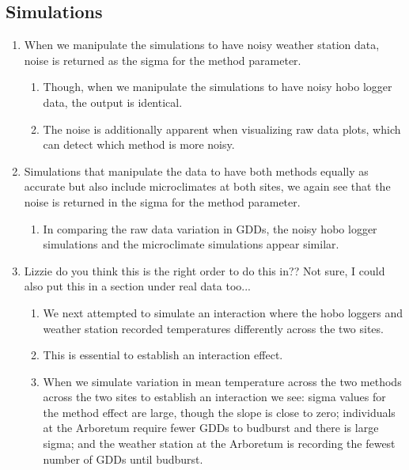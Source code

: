 \documentclass{article}\usepackage[]{graphicx}\usepackage[]{color}
\begin{document}
\subsection*{Simulations}
\begin{enumerate}
\item When we manipulate the simulations to have noisy weather station data, noise is returned as the sigma for the method parameter. 
  \begin{enumerate}
  \item Though, when we manipulate the simulations to have noisy hobo logger data, the output is identical.
  \item The noise is additionally apparent when visualizing raw data plots, which can detect which method is more noisy.
  \end{enumerate}
  
\item Simulations that manipulate the data to have both methods equally as accurate but also include microclimates at both sites, we again see that the noise is returned in the sigma for the method parameter. 
  \begin{enumerate}
  \item In comparing the raw data variation in GDDs, the noisy hobo logger simulations and the microclimate simulations appear similar. 
  \end{enumerate}
  
\item Lizzie do you think this is the right order to do this in?? Not sure, I could also put this in a section under real data too...
  \begin{enumerate}
  \item We next attempted to simulate an interaction where the hobo loggers and weather station recorded temperatures differently across the two sites. %
  \item This is essential to establish an interaction effect. 
  \item When we simulate variation in mean temperature across the two methods across the two sites to establish an interaction we see: sigma values for the method effect are large, though the slope is close to zero; individuals at the Arboretum require fewer GDDs to budburst and there is large sigma; and the weather station at the Arboretum is recording the fewest number of GDDs until budburst.
  \end{enumerate}
\end{enumerate}
\end{document}
